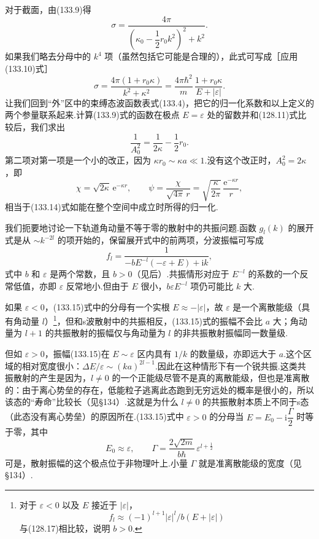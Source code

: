 对于截面，由(133.9)得
\begin{equation*}
  \sigma=\frac{4\pi}{\left(\kappa_0-\dfrac{1}{2}r_0k^2\right)^2+k^2}.
\end{equation*}
如果我们略去分母中的 $k^4$ 项（虽然包括它可能是合理的），此式可写成［应用(133.10)式］
\begin{equation}
  \sigma=\frac{4\pi(1+r_0\kappa)}{k^2+\kappa^2}
  =\frac{4\pi\hbar^2}{m}\,\frac{1+r_0\kappa}{E+|\varepsilon|}.
\end{equation}
让我们回到“外”区中的束缚态波函数表式(133.4)，把它的归一化系数和以上定义的两个参量联系起来.计算(133.9)式的函数在极点 $E=\varepsilon$ 处的留数并和(128.11)式比较后，我们求出
\begin{equation}
  \frac{1}{A_0^2}=\frac{1}{2\kappa}-\frac{1}{2}r_0.
\end{equation}
第二项对第一项是一个小的改正，因为 $\kappa r_0\sim\kappa a\ll1$.没有这个改正时，$A_0^2=2\kappa$，即
\begin{equation}
  \chi=\sqrt{2\kappa}\,\mathrm{e}^{-\kappa r},\qquad
  \psi=\frac{\chi}{\sqrt{4\pi}\,r}
  =\sqrt{\frac{\kappa}{2\pi}}\,\frac{\mathrm{e}^{-\kappa r}}{r},
\end{equation}
相当于(133.14)式如能在整个空间中成立时所得的归一化.

我们扼要地讨论一下轨道角动量不等于零的散射中的共振问题.函数 $g_l(k)$ 的展开式是从 $\sim k^{-2l}$ 的项开始的，保留展开式中的前两项，分波振幅可写成
\begin{equation}
  f_l=\frac{1}{-bE^{-l}(-\varepsilon+E)+\mathrm{i}k},
\end{equation}
式中 $b$ 和 $\varepsilon$ 是两个常数，且 $b>0$（见后）.共振情形对应于 $E^{-l}$ 的系数的一个反常低值，亦即 $\varepsilon$ 反常地小.但由于 $E$ 很小，$b\varepsilon E^{-l}$ 项仍可能比 $k$ 大.

如果 $\varepsilon<0$，(133.15)式中的分母有一个实根 $E\approx-|\varepsilon|$，故 $\varepsilon$ 是一个离散能级（具有角动量 $l$）\footnote{对于 $\varepsilon<0$ 以及 $E$ 接近于 $|\varepsilon|$，
\begin{equation*}
  f_l\approx(-1)^{l+1}|\varepsilon|^l/b(E+|\varepsilon|)
\end{equation*}
与(128.17)相比较，说明 $b>0$.}，但和s波散射中的共振相反，(133.15)式的振幅不会比 $a$ 大；角动量为 $l+1$ 的共振散射的振幅仅与角动量为 $l$ 的非共振散射振幅同一数量级.

但如 $\varepsilon>0$，振幅(133.15)在 $E\sim\varepsilon$ 区内具有 $1/k$ 的数量级，亦即远大于 $a$.这个区域的相对宽度很小：$\Delta E/\varepsilon\sim(ka)^{2l-1}$.因此在这种情形下有一个锐共振.这类共振散射的产生是因为，$l\neq0$ 的一个正能级尽管不是真的离散能级，但也是准离散的：由于离心势垒的存在，低能粒子逃离此态跑到无穷远处的概率是很小的，所以该态的“寿命”比较长（见§134）.这就是为什么 $l\neq0$ 的共振散射本质上不同于s态（此态没有离心势垒）的原因所在.(133.15)式中 $\varepsilon>0$ 的分母当 $E=E_0-\mathrm{i}\dfrac{\Gamma}{2}$ 时等于零，其中
\begin{equation}
  E_0\approx\varepsilon,\qquad
  \Gamma=\frac{2\sqrt{2m}}{b\hbar}\,\varepsilon^{l+\frac{1}{2}}
\end{equation}
可是，散射振幅的这个极点位于非物理叶上.小量 $\Gamma$ 就是准离散能级的宽度（见§134）.

